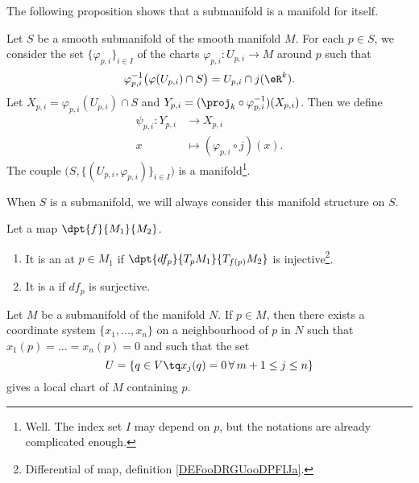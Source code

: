 The following proposition shows that a submanifold is a manifold for itself.
\begin{proposition}      \label{PROPooRZIHooXIhnpq}
    Let \( S\) be a smooth submanifold of the smooth manifold \( M\). For each \( p\in S\), we consider the set \( \{ \varphi_{p,i} \}_{i\in I}\) of the charts \( \varphi_{p,i}\colon U_{p,i}\to M\) around \( p\) such that
    \begin{equation}
        \varphi_{p,i}^{-1}\big( \varphi(U_{p,i})\cap S \big)=U_{p,i}\cap j(\eR^k).
    \end{equation}
    Let \( X_{p,i}=\varphi_{p,i}(U_{p,i})\cap S\) and \( Y_{p,i}=(\proj_k\circ\varphi_{p,i}^{-1})(X_{p,i})\). Then we define
    \begin{equation}
        \begin{aligned}
            \psi_{p,i}\colon Y_{p,i}&\to X_{p,i} \\
            x&\mapsto (\varphi_{p,i}\circ j)(x). 
        \end{aligned}
    \end{equation}
    The couple \( \big( S,\{ (U_{p,i},\varphi_{p,i}) \}_{i\in I} \big)\) is a manifold\footnote{Well. The index set \( I\) may depend on \( p\), but the notations are already complicated enough.}.

    When \( S\) is a submanifold, we will always consider this manifold structure on \( S\).
\end{proposition}

\begin{definition}      \label{DEFooZKUIooXWVGvh}
    Let a map $\dpt{f}{M_1}{M_2}$.
    \begin{enumerate}
        \item
        It is an  at $p\in M_1$ if $\dpt{df_p}{T_pM_1}{T_{f(p)}M_2}$ is injective\footnote{Differential of map, definition \ref{DEFooDRGUooDPFIJa}.}. 
    \item
        It is a  if $df_p$ is surjective.
    \end{enumerate}
\end{definition}

\begin{proposition}       \label{PROPooLJYEooMjevio}
    Let $M$ be a submanifold of the manifold $N$. If $p\in M$, then there  exists a coordinate system $\{x_1,\ldots,x_n\}$ on a neighbourhood of $p$ in $N$ such that $x_1(p)=\ldots=x_n(p)=0$ and such that the set
    \[
    U=\{q\in V\tq x_j(q)=0\,\forall\, m+1\leq j\leq n\}
    \]
    gives a local chart of $M$ containing $p$.
\end{proposition}

